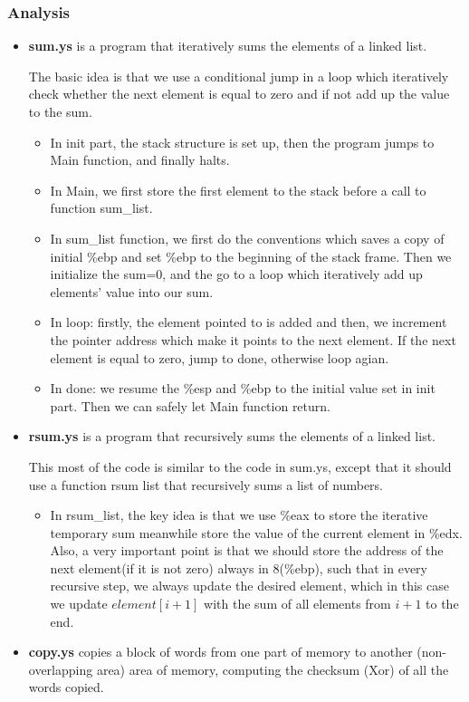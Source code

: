 \documentclass{article}
\begin{document}
\subsubsection{Analysis}
\begin{itemize}
\item \textbf{sum.ys}
 is a program that iteratively sums the elements of a linked list. 

The basic idea is that we use a conditional jump in a loop which iteratively check whether the next element is equal to zero and if not add up the value to the sum.

\begin{itemize}
\item In init part, the stack structure is set up, then the program jumps to Main function, and finally halts.
\item In Main, we first store the first element to the stack before a call to function sum\_list. 
\item In sum\_list function, we first do the conventions which saves a copy of initial \%ebp and set \%ebp to the beginning of the stack frame. Then we initialize the sum=0, and the go to a loop which iteratively add up elements' value into our sum. 
\item In loop: firstly, the element pointed to is added and then, we increment the pointer address which make it points to the next element. If the next element is equal to zero, jump to done, otherwise loop agian. 
\item In done: we resume the \%esp and \%ebp to the initial value set in init part. Then we can safely let Main function return.
\end{itemize}

\item \textbf{rsum.ys}
is a program that recursively sums the elements of a linked list. 

This most of the code is similar to the code in sum.ys, except that it should use a function rsum list that recursively sums a list of numbers. 

\begin{itemize}
\item In rsum\_list, the key idea is that we use \%eax to store the iterative temporary sum meanwhile store the value of the current element in \%edx. Also, a very important point is that we should store the address of the next element(if it is not zero) always in 8(\%ebp), such that in every recursive step, we always update the desired element, which in this case we update $element[i+1]$ with the sum of all elements from $i+1$ to the end.
\end{itemize}
\item \textbf{copy.ys} copies a block of words from one part of memory to another (non-overlapping area) area of memory, computing the checksum (Xor) of all the words copied.


\end{itemize}
\end{document}
